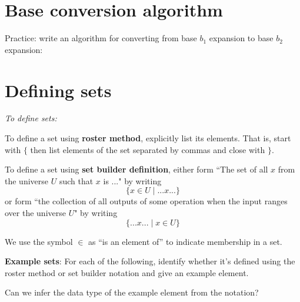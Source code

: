 \documentclass[12pt, oneside]{article}
\begin{document}
\vfill
\vfill
\newpage \vfill
\section*{Base conversion algorithm}




Practice: write an algorithm for converting from base $b_1$ expansion to base $b_2$ expansion:

\phantom{
Earlier, we saw (two different) algorithms for, given 
a target base $b$, converting from decimal to base $b$ expansions. 
We will use either one of these as a subroutine in this algorithm.\\
Given a base expansion in base $b_1$:\\
Step 1: Use the definition of base expansion to calculate the value of
    this number (in decimal).\\
Step 2: Use the Least Significant First algorithm to write this value in 
    base $b_2$ and output the result.
}
\vspace{200pt} \vfill
\section*{Defining sets}


{\it To define sets:}

To define a set using {\bf roster method}, explicitly list its elements. That is,
start with $\{$ then list elements of 
the set separated by commas and close with $\}$.

\vfill

To define a set using {\bf set builder definition}, either form 
``The set of all $x$ from the universe $U$ such that $x$ is ..." by writing
\[\{x \in U \mid ...x... \}\]
or form ``the collection of all outputs of some operation when the input ranges over the universe $U$"
by writing
\[\{ ...x... \mid x\in U \}\]

\vfill

We use the symbol $\in$ as ``is an element of'' to indicate membership in a set.\\

\newpage 

{\bf Example sets}: For each of the following, identify whether it's defined using the roster method
or set builder notation and give an example element.

Can we infer the data type of the example element from the notation?
\end{document}

